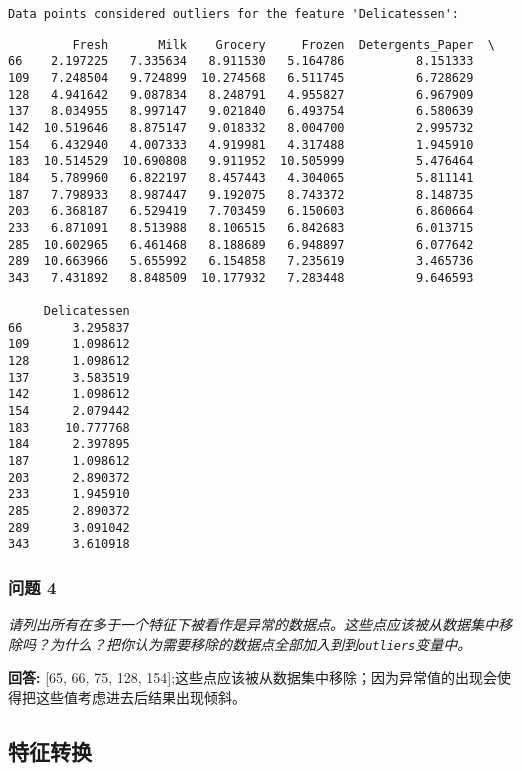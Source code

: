 \documentclass[11pt]{article}
\begin{document}
    
    \begin{Verbatim}[commandchars=\\\{\}]
Data points considered outliers for the feature 'Delicatessen':

    \end{Verbatim}

    
    \begin{verbatim}
         Fresh       Milk    Grocery     Frozen  Detergents_Paper  \
66    2.197225   7.335634   8.911530   5.164786          8.151333   
109   7.248504   9.724899  10.274568   6.511745          6.728629   
128   4.941642   9.087834   8.248791   4.955827          6.967909   
137   8.034955   8.997147   9.021840   6.493754          6.580639   
142  10.519646   8.875147   9.018332   8.004700          2.995732   
154   6.432940   4.007333   4.919981   4.317488          1.945910   
183  10.514529  10.690808   9.911952  10.505999          5.476464   
184   5.789960   6.822197   8.457443   4.304065          5.811141   
187   7.798933   8.987447   9.192075   8.743372          8.148735   
203   6.368187   6.529419   7.703459   6.150603          6.860664   
233   6.871091   8.513988   8.106515   6.842683          6.013715   
285  10.602965   6.461468   8.188689   6.948897          6.077642   
289  10.663966   5.655992   6.154858   7.235619          3.465736   
343   7.431892   8.848509  10.177932   7.283448          9.646593   

     Delicatessen  
66       3.295837  
109      1.098612  
128      1.098612  
137      3.583519  
142      1.098612  
154      2.079442  
183     10.777768  
184      2.397895  
187      1.098612  
203      2.890372  
233      1.945910  
285      2.890372  
289      3.091042  
343      3.610918  
    \end{verbatim}

    
    \hypertarget{ux95eeux9898-4}{%
\subsubsection{问题 4}\label{ux95eeux9898-4}}

\emph{请列出所有在多于一个特征下被看作是异常的数据点。这些点应该被从数据集中移除吗？为什么？把你认为需要移除的数据点全部加入到到\texttt{outliers}变量中。}

    \textbf{回答:} {[}65, 66, 75, 128,
154{]};这些点应该被从数据集中移除；因为异常值的出现会使得把这些值考虑进去后结果出现倾斜。

    \hypertarget{ux7279ux5f81ux8f6cux6362}{%
\subsection{特征转换}\label{ux7279ux5f81ux8f6cux6362}}
\end{document}
